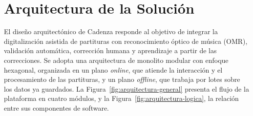 \documentclass[conference]{IEEEtran}
\begin{document}
\section{Arquitectura de la Solución}
\label{sec:arquitectura}

El diseño arquitectónico de Cadenza responde al objetivo de integrar la
digitalización asistida de partituras con reconocimiento óptico de música
(OMR), validación automática, corrección humana y aprendizaje a partir de
las correcciones. Se adopta una arquitectura de monolito modular con
enfoque hexagonal, organizada en un plano \textit{online}, que atiende la
interacción y el procesamiento de las partituras, y un plano
\textit{offline}, que trabaja por lotes sobre los datos ya guardados.
La Figura~\ref{fig:arquitectura-general} presenta el flujo de la
plataforma en cuatro módulos, y la Figura~\ref{fig:arquitectura-logica},
la relación entre sus componentes de software.
\end{document}
